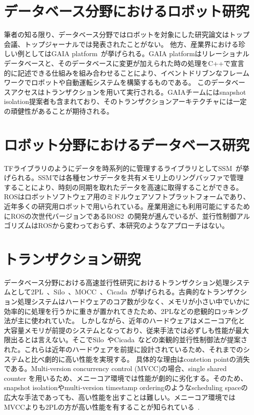 \documentclass[a4paper]{jreport}	%
\begin{document}
\section{データベース分野におけるロボット研究}
%
筆者の知る限り、データベース分野ではロボットを対象にした研究論文はトップ会議、トップジャーナルでは発表されたことがない。
%
他方、産業界における珍しい例としてはGAIA platform~\cite{gaia}が挙げられる。GAIA platformはリレーショナルデータベースと、そのデータベースに変更が加えられた時の処理をC++で宣言的に記述できる仕組みを組み合わせることにより、イベントドリブンなフレームワークでロボットや自動運転システムを構築するものである。
このデータベースアクセスはトランザクションを用いて実行される。GAIAチームにはsnapshot isolation提案者も含まれており、そのトランザクションアーキテクチャには一定の頑健性があることが期待される。

\section{ロボット分野におけるデータベース研究}
TFライブラリのようにデータを時系列的に管理するライブラリとしてSSM~\cite{ssm}が挙げられる。SSMでは各種センサデータを共有メモリ上のリングバッファで管理することにより、時刻の同期を取れたデータを高速に取得することができる。
ROSはロボットソフトウェア用のミドルウェアソフトプラットフォームであり、近年多くの研究用ロボットで用いられている。産業用途にも利用可能にするためにROSの次世代バージョンであるROS2~\cite{ros2}の開発が進んでいるが、並行性制御アルゴリズムはROSから変わっておらず、本研究のようなアプローチはない。
\section{トランザクション研究}
データベース分野における高速並行性研究におけるトランザクション処理システムとして2PL~\cite{2PL}、Silo~\cite{silo}、MOCC~\cite{MOCC}、Cicada~\cite{Cicada}が挙げられる。古典的なトランザクション処理システムはハードウェアのコア数が少なく、メモリが小さい中でいかに効率的に処理を行うかに重きが置かれてきたため、2PLなどの悲観的ロッキング法が主に使われていた。
しかしながら、近年のハードウェアはメニーコア化と大容量メモリが前提のシステムとなっており、従来手法では必ずしも性能が最大限出るとは言えない。そこでSilo~\cite{silo}やCicada~\cite{Cicada}などの楽観的並行性制御法が提案された。これらは近年のハードウェアを前提に設計されているため、それまでのシステムと比べ劇的に高い性能を実現する。
具体的な理由はcontetion pointの消失である。Multi-version concurrency control (MVCC)の場合、single shared counter を用いるため、メニーコア環境では性能が劇的に劣化する。そのため、snapshot isolationやmulti-version timestamp orderingのようなscheduling spaceの広大な手法であっても、高い性能を出すことは難しい。メニーコア環境ではMVCCよりも2PLの方が高い性能を有することが知られている~\cite{ccbench}.
\end{document}
